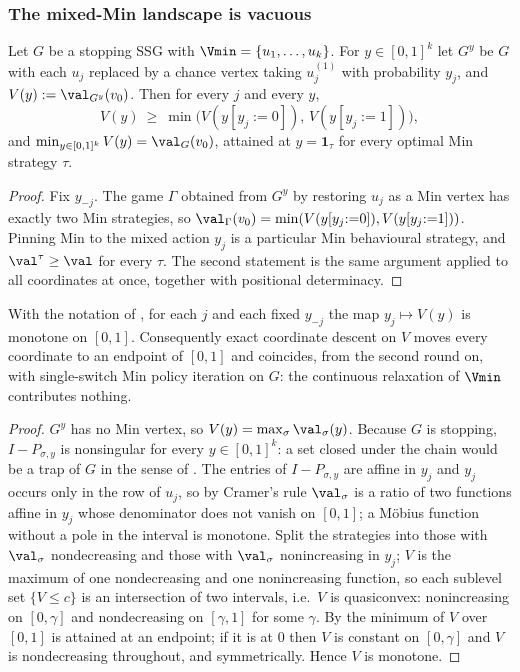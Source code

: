 \subsubsection*{The mixed-Min landscape is vacuous}

\begin{lemma}\label{lem:fs16-mixmin}
Let $G$ be a stopping SSG with $\Vmin=\{u_1,\dots,u_k\}$. For
$y\in[0,1]^{k}$ let $G^{y}$ be $G$ with each $u_j$ replaced by a chance vertex
taking $u_j^{(1)}$ with probability $y_j$, and $V(y):=\val_{G^{y}}(v_0)$. Then
for every $j$ and every $y$,
\[
  V(y)\ \ge\ \min\bigl(V(y[y_j{:=}0]),\,V(y[y_j{:=}1])\bigr),
\]
and $\min_{y\in[0,1]^k}V(y)=\val_G(v_0)$, attained at $y=\mathbf 1_{\tau}$ for
every optimal Min strategy $\tau$.
\end{lemma}

\begin{proof}
Fix $y_{-j}$. The game $\Gamma$ obtained from $G^{y}$ by restoring $u_j$ as a
Min vertex has exactly two Min strategies, so
$\val_\Gamma(v_0)=\min(V(y[y_j{:=}0]),V(y[y_j{:=}1]))$. Pinning Min to the
mixed action $y_j$ is a particular Min behavioural strategy, and
$\val^{\tau}\ge\val$ for every $\tau$. The second statement is the same
argument applied to all coordinates at once, together with positional
determinacy.
\end{proof}

\begin{proposition}\label{prop:fs16-mixmono}
With the notation of , for each $j$ and each fixed
$y_{-j}$ the map $y_j\mapsto V(y)$ is monotone on $[0,1]$. Consequently exact
coordinate descent on $V$ moves every coordinate to an endpoint of $[0,1]$ and
coincides, from the second round on, with single-switch Min policy iteration on
$G$: the continuous relaxation of $\Vmin$ contributes nothing.
\end{proposition}

\begin{proof}
$G^y$ has no Min vertex, so $V(y)=\max_\sigma\val_\sigma(y)$. Because $G$ is
stopping, $I-P_{\sigma,y}$ is nonsingular for every $y\in[0,1]^k$: a set closed
under the chain would be a trap of $G$ in the sense of . The
entries of $I-P_{\sigma,y}$ are affine in $y_j$ and $y_j$ occurs only in the
row of $u_j$, so by Cramer's rule $\val_\sigma$ is a ratio of two functions
affine in $y_j$ whose denominator does not vanish on $[0,1]$; a M\"obius
function without a pole in the interval is monotone. Split the strategies into
those with $\val_\sigma$ nondecreasing and those with $\val_\sigma$
nonincreasing in $y_j$; $V$ is the maximum of one nondecreasing and one
nonincreasing function, so each sublevel set $\{V\le c\}$ is an intersection of
two intervals, i.e.\ $V$ is quasiconvex: nonincreasing on $[0,\gamma]$ and
nondecreasing on $[\gamma,1]$ for some $\gamma$. By
 the minimum of $V$ over $[0,1]$ is attained at an
endpoint; if it is at $0$ then $V$ is constant on $[0,\gamma]$ and $V$ is
nondecreasing throughout, and symmetrically. Hence $V$ is monotone.
\end{proof}

